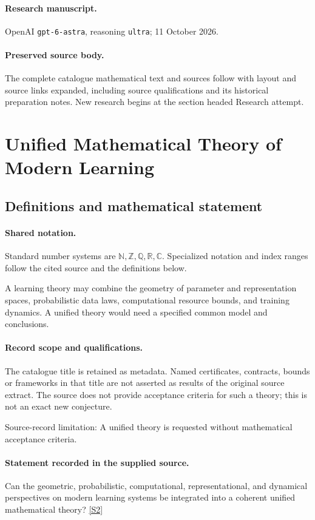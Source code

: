 \documentclass[11pt]{article}
\begin{document}
\paragraph{Research manuscript.} OpenAI \texttt{gpt-6-astra}, reasoning \texttt{ultra}; 11 October 2026.
\paragraph{Preserved source body.} The complete catalogue mathematical text and sources follow with layout and source links expanded, including source qualifications and its historical preparation notes. New research begins at the section headed Research attempt.

\section{Unified Mathematical Theory of Modern Learning}\label{statement}

\subsection{Definitions and mathematical statement}

\paragraph{Shared notation.}Standard number systems are $\mathbb N,\mathbb Z,\mathbb Q,\mathbb R,\mathbb C$. Specialized notation and index ranges follow the cited source and the definitions below.


A learning theory may combine the geometry of parameter and representation spaces, probabilistic data laws, computational resource bounds, and training dynamics. A unified theory would need a specified common model and conclusions.
\paragraph{Record scope and qualifications.}
The catalogue title is retained as metadata. Named certificates, contracts, bounds or frameworks in that title are not asserted as results of the original source extract.
The source does not provide acceptance criteria for such a theory; this is not an exact new conjecture.

Source-record limitation: A unified theory is requested without mathematical acceptance criteria.
\paragraph{Statement recorded in the supplied source.}
Can the geometric, probabilistic, computational, representational, and dynamical perspectives on modern learning systems be integrated into a coherent unified mathematical theory? \href{https://doi.org/10.4171/owr/2026/11}{[S2]}
\end{document}
